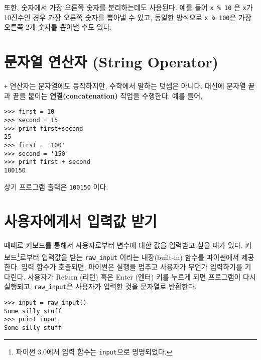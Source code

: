 
또한, 숫자에서 가장 오른쪽 숫자를 분리하는데도 사용된다. 
예를 들어 {\tt x \% 10} 은 {\tt x}가 10진수인 경우 가장 오른쪽 숫자를 뽑아낼 수 있고, 동일한 방식으로 {\tt x \% 100}은 가장 오른쪽 2개 숫자를 뽑아낼 수도 있다.

\section{문자열 연산자 (String Operator)}

{\tt +} 연산자는 문자열에도 동작하지만, 수학에서 말하는 덧셈은 아니다. 
대신에 문자열 끝과 끝을 붙이는 {\bf 연결(concatenation)} 작업을 수행한다. 예를 들어,


\beforeverb
\begin{verbatim}
>>> first = 10
>>> second = 15
>>> print first+second
25
>>> first = '100'
>>> second = '150'
>>> print first + second
100150
\end{verbatim}
\afterverb
%

상기 프로그램 출력은 {\tt 100150} 이다.

\section{사용자에게서 입력값 받기}


때때로 키보드를 통해서 사용자로부터 변수에 대한 값을 입력받고 싶을 때가 있다. 
키보드\footnote{파이썬 3.0에서 입력 함수는 {\tt input}으로 명명되었다.}로부터 입력값을 받는 \verb"raw_input" 이라는 내장(built-in) 함수를 파이썬에서 제공한다. 입력 함수가 호출되면, 파이썬은 실행을 멈추고 사용자가 무언가 입력하기를 기다린다. 
사용자가 {\sf Return (리턴)} 혹은 {\sf Enter (엔터)} 키를 누르게 되면 프로그램이 다시 실행되고, \verb"raw_input"은 사용자가 입력한 것을 문자열로 반환한다.


\beforeverb
\begin{verbatim}
>>> input = raw_input()
Some silly stuff
>>> print input
Some silly stuff
\end{verbatim}
\afterverb
%

